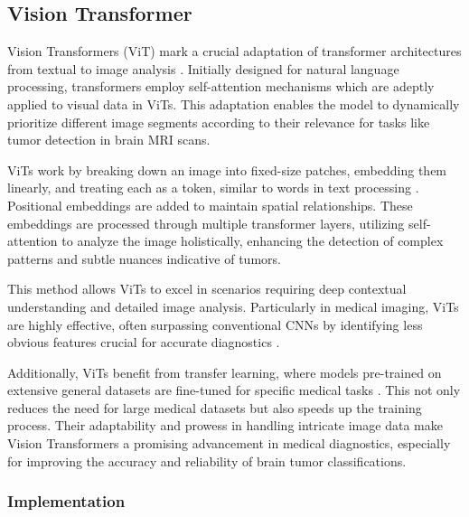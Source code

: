 \subsection{Vision Transformer}\label{s:vit}

Vision Transformers (ViT) mark a crucial adaptation of transformer architectures from textual to image analysis \cite{Khan2021Transformers}. Initially designed for natural language processing, transformers employ self-attention mechanisms which are adeptly applied to visual data in ViTs. This adaptation enables the model to dynamically prioritize different image segments according to their relevance for tasks like tumor detection in brain MRI scans.

ViTs work by breaking down an image into fixed-size patches, embedding them linearly, and treating each as a token, similar to words in text processing \cite{Wu2020Visual}. Positional embeddings are added to maintain spatial relationships. These embeddings are processed through multiple transformer layers, utilizing self-attention to analyze the image holistically, enhancing the detection of complex patterns and subtle nuances indicative of tumors.

This method allows ViTs to excel in scenarios requiring deep contextual understanding and detailed image analysis. Particularly in medical imaging, ViTs are highly effective, often surpassing conventional CNNs by identifying less obvious features crucial for accurate diagnostics \cite{Matsoukas2021Is}.

Additionally, ViTs benefit from transfer learning, where models pre-trained on extensive general datasets are fine-tuned for specific medical tasks \cite{Simon2022Vision}. This not only reduces the need for large medical datasets but also speeds up the training process. Their adaptability and prowess in handling intricate image data make Vision Transformers a promising advancement in medical diagnostics, especially for improving the accuracy and reliability of brain tumor classifications.


\subsubsection{Implementation}

